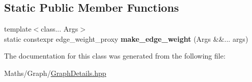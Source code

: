 \subsection*{Static Public Member Functions}
\begin{DoxyCompactItemize}
\item 
\mbox{\label{classsequoia_1_1maths_1_1graph__impl_1_1weight__maker_3_01_node_weight_pooling_00_01_edge_weight9e5a11aa4386c3e35769774740a56bd6_a9daa7dc604ad3003be3341e848093720}} 
{\footnotesize template$<$class... Args$>$ }\\static constexpr edge\+\_\+weight\+\_\+proxy {\bfseries make\+\_\+edge\+\_\+weight} (Args \&\&... args)
\end{DoxyCompactItemize}


The documentation for this class was generated from the following file\+:\begin{DoxyCompactItemize}
\item 
Maths/\+Graph/\mbox{\hyperlink{_graph_details_8hpp}{Graph\+Details.\+hpp}}\end{DoxyCompactItemize}
